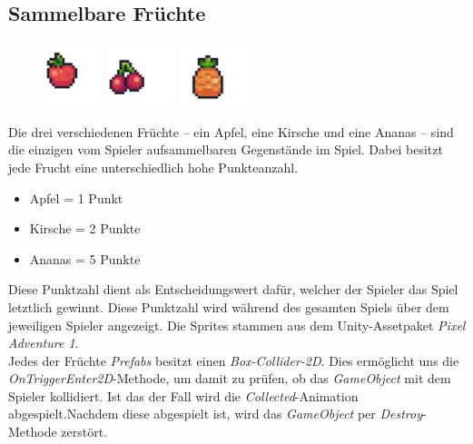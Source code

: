 \subsection{Sammelbare Früchte}

\begin{figure}[H]
\includegraphics[width=17mm]{Figures/apple.png}
\includegraphics[width=20mm]{Figures/cherry.png}
\includegraphics[width=20mm]{Figures/pineapple.png}
\label{fig:fruits}
\end{figure}

Die drei verschiedenen Früchte – ein Apfel, eine Kirsche und eine Ananas – sind die einzigen vom Spieler aufsammelbaren Gegenstände im Spiel. Dabei besitzt jede Frucht eine unterschiedlich hohe Punkteanzahl.

\begin{itemize}
\item Apfel = 1 Punkt
\item Kirsche = 2 Punkte
\item Ananas = 5 Punkte
\end{itemize}

Diese Punktzahl dient als Entscheidungswert dafür, welcher der Spieler das Spiel letztlich gewinnt. Diese Punktzahl wird während des gesamten Spiels über dem jeweiligen Spieler angezeigt. Die Sprites stammen aus dem Unity-Assetpaket \textit{Pixel Adventure 1}.\\

Jedes der Früchte \textit{Prefabs} besitzt einen \textit{Box-Collider-2D}. Dies ermöglicht uns die \textit{OnTriggerEnter2D}-Methode, um damit zu prüfen, ob das \textit{GameObject} mit dem Spieler kollidiert. Ist das der Fall wird die \textit{Collected}-Animation abgespielt.Nachdem diese abgespielt ist, wird das \textit{GameObject} per \textit{Destroy}-Methode zerstört.\\

